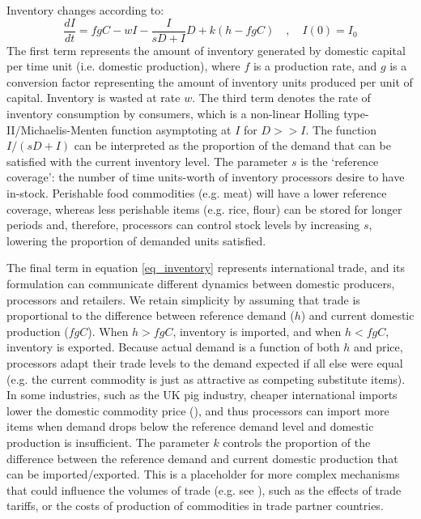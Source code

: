 \documentclass[12pt]{article}
\begin{document}
Inventory changes according to:
%
\begin{equation}
  \frac{dI}{dt} = f g C - w I - \frac{I}{sD + I} D + k (h - f g C) \quad, \quad I(0) = I_0
  \label{eq_inventory}
\end{equation}
%
The first term represents the amount of inventory generated by domestic capital per time unit (i.e. domestic production), where $f$ is a production rate, and $g$ is a conversion factor representing the amount of inventory units produced per unit of capital. Inventory is wasted at rate $w$. The third term denotes the rate of inventory consumption by consumers, which is a non-linear Holling type-II/Michaelis-Menten function asymptoting at $I$ for $D >> I$. The function $I/(sD + I)$ can be interpreted as the proportion of the demand that can be satisfied with the current inventory level. The parameter $s$ is the `reference coverage': the number of time units-worth of inventory processors desire to have in-stock. Perishable food commodities (e.g. meat) will have a lower reference coverage, whereas less perishable items (e.g. rice, flour) can be stored for longer periods and, therefore, processors can control stock levels by increasing $s$, lowering the proportion of demanded units satisfied.

The final term in equation \ref{eq_inventory} represents international trade, and its formulation can communicate different dynamics between domestic producers, processors and retailers. We retain simplicity by assuming that trade is proportional to the difference between reference demand ($h$) and current domestic production ($f g C$). When $h > f g C$, inventory is imported, and when $h < f g C$, inventory is exported. Because actual demand is a function of both $h$ and price, processors adapt their trade levels to the demand expected if all else were equal (e.g. the current commodity is just as attractive as competing substitute items). In some industries, such as the UK pig industry, cheaper international imports lower the domestic commodity price (\cite{AHDBeuroexhange2015}), and thus processors can import more items when demand drops below the reference demand level and domestic production is insufficient. The parameter $k$ controls the proportion of the difference between the reference demand and current domestic production that can be imported/exported. This is a placeholder for more complex mechanisms that could influence the volumes of trade (e.g. see \cite{tu2019}), such as the effects of trade tariffs, or the costs of production of commodities in trade partner countries.
\end{document}

